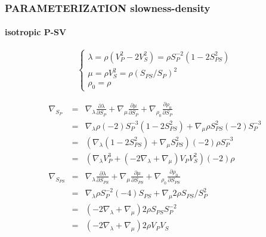 \documentclass[9pt]{beamer}
\newcommand{\partderi}[2]{\frac{\partial#1}{\partial#2}}
\begin{document}
\begin{frame}\frametitle{PARAMETERIZATION slowness-density}
\framesubtitle{isotropic P-SV}
  
  \begin{center}
  \end{center}
  
  \[\left\{ \begin{array}{l}
    \lambda = \rho (V_P^{2}-2V_S ^2) = \rho S_P^{-2} (1-2S_{PS}^2) \\
    \mu    = \rho V_S^2 = \rho (S_{PS}/S_P)^2 \\
    \rho_0 = \rho 
  \end{array} \right.\]
  
  \begin{eqnarray}
    \nabla_{S_P} &=& \nabla_\lambda \partderi{\lambda}{S_P} + \nabla_\mu \partderi{\mu}{S_P} + \nabla_{\rho_0} \partderi{\rho_0}{S_P} \nonumber\\
		 &=& \nabla_\lambda \rho(-2)S_P^{-3}(1-2S_{PS}^2) + \nabla_\mu \rho S_{PS}^2(-2)S_P^{-3} \nonumber\\
		 &=& \left(\nabla_\lambda (1-2S_{PS}^2) + \nabla_\mu S_{PS}^2 \right)(-2)\rho S_P^{-3} \nonumber\\
		 &=& \left(\nabla_\lambda V_P^3 + (-2\nabla_\lambda + \nabla_\mu) V_P V_S^2 \right)(-2)\rho \nonumber\\
    \nabla_{S_{PS}} &=& \nabla_\lambda \partderi{\lambda}{S_{PS}} + \nabla_\mu \partderi{\mu}{S_{PS}} + \nabla_{\rho_0} \partderi{\rho_0}{S_{PS}} \nonumber\\
		    &=& \nabla_\lambda \rho S_P^{-2}(-4)S_{PS} + \nabla_\mu 2\rho S_{PS}/S_P^2 \nonumber\\
		    &=& \left(-2\nabla_\lambda + \nabla_\mu \right) 2\rho S_{PS} S_P^{-2} \nonumber\\
		    &=& \left(-2\nabla_\lambda + \nabla_\mu \right) 2\rho V_P V_S \nonumber
  \end{eqnarray}

\end{frame}
\end{document}
